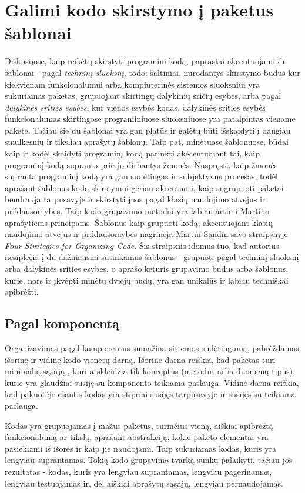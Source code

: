 \section{Galimi kodo skirstymo į paketus šablonai}
Diskusijose, kaip reikėtų skirstyti programini kodą, paprastai akcentuojami du šablonai - pagal \textit{techninį sluoksnį}, todo: šaltiniai, nurodantys skirstymo būdus
kur kiekvienam funkcionalumui arba kompiuterinės sistemos sluoksniui yra sukuriamas paketas,
grupuojant skirtingų dalykinių sričių esybes, arba pagal \textit{dalykinės srities esybes}, kur vienos esybės kodas, dalykinės srities
esybės funkcionalumas skirtingose programiniuose sluoksniuose yra patalpintas viename pakete.
Tačiau šie du šablonai yra gan platūs ir galėtų būti išskaidyti į daugiau smulkesnių ir tiksliau aprašytų šablonų.
Taip pat, minėtuose šablonuose, būdai kaip ir kodėl skaidyti programinį kodą parinkti akecentuojant tai, kaip programinį
kodą supranta prie jo dirbantys žmonės.
Nuspręsti, kaip žmonės supranta programinį kodą yra gan sudėtingas ir subjektyvus procesas, todėl aprašant šablonus kodo skirstymui
geriau akcentuoti, kaip sugrupuoti paketai bendrauja tarpusavyje ir skirstyti juos pagal klasių naudojimo atvejus ir priklausomybes.
Taip kodo grupavimo metodai yra labiau artimi Martino aprašytiems principams.
Šablonus kaip grupuoti kodą, akcentuojant klasių naudojimo atvejus ir priklausomybes nagrinėja Martin Sandin savo
straipsnyje \textit{Four Strategies for Organizing Code}.
Šis straipsnis idomus tuo, kad autorius nesiplečia į du dažniausiai sutinkamus šablonus - grupuoti pagal techninį sluoksnį arba dalykinės srities esybes,
o aprašo keturis grupavimo būdus arba šablonus, kurie, nors ir įkvėpti minėtų dviejų budų, yra gan unikalūs ir labiau techniškai apibrėžti.


\subsection{Pagal komponentą}
Organizavimas pagal komponentus sumažina sistemos sudėtingumą, pabrėždamas išorinę ir vidinę kodo vienetų darną.
Išorinė darna reiškia, kad paketas turi minimalią sąsają , kuri atskleidžia tik konceptus (metodus arba duomenų tipus),
kurie yra glaudžiai susiję su komponento teikiama paslauga.
Vidinė darna reiškia, kad pakuotėje esantis kodas yra stipriai susijęs tarpusavyje ir susijęs su teikiama paslauga.

Kodas yra grupuojamas į mažus paketus, turinčius vieną, aiškiai apibrėžtą funkcionalumą ar tikslą, aprašant abstrakciją, kokie paketo elementai
yra pasiekiami iš išorės ir kaip jie naudojami.
Taip sukuriamas kodas, kuris yra lengviau suprantamas.
Tokią kodo grupavimo tvarką sunku palaikyti, tačiau jos rezultatas - kodas, kuris yra lengviau suprantamas, lengviau pagerinamas, lengviau testuojamas
ir, dėl aiškiai aprašytų sąsajų, lengviau pernaudojamas.

